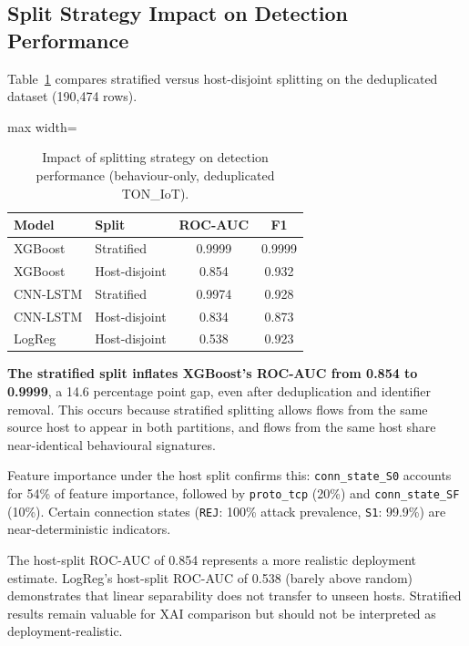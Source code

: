 \documentclass[12pt,a4paper]{report}
\begin{document}
\subsection{Split Strategy Impact on Detection Performance}
\label{sec:split-impact}

Table~\ref{tab:split-impact} compares stratified versus host-disjoint splitting on the deduplicated dataset (190,474 rows).

\begin{table}[H]
\centering
\caption{Impact of splitting strategy on detection performance (behaviour-only, deduplicated TON\_IoT).}
\label{tab:split-impact}
\begin{adjustbox}{max width=\textwidth}
\begin{tabular}{llcc}
\toprule
\textbf{Model} & \textbf{Split} & \textbf{ROC-AUC} & \textbf{F1} \\
\midrule
XGBoost & Stratified & 0.9999 & 0.9999 \\
XGBoost & Host-disjoint & 0.854 & 0.932 \\
CNN-LSTM & Stratified & 0.9974 & 0.928 \\
CNN-LSTM & Host-disjoint & 0.834 & 0.873 \\
LogReg & Host-disjoint & 0.538 & 0.923 \\
\bottomrule
\end{tabular}
\end{adjustbox}
\end{table}

\textbf{The stratified split inflates XGBoost's ROC-AUC from 0.854 to 0.9999}, a 14.6 percentage point gap, even after deduplication and identifier removal. This occurs because stratified splitting allows flows from the same source host to appear in both partitions, and flows from the same host share near-identical behavioural signatures.

Feature importance under the host split confirms this: \texttt{conn\_state\_S0} accounts for 54\% of feature importance, followed by \texttt{proto\_tcp} (20\%) and \texttt{conn\_state\_SF} (10\%). Certain connection states (\texttt{REJ}: 100\% attack prevalence, \texttt{S1}: 99.9\%) are near-deterministic indicators.

The host-split ROC-AUC of 0.854 represents a more realistic deployment estimate. LogReg's host-split ROC-AUC of 0.538 (barely above random) demonstrates that linear separability does not transfer to unseen hosts. Stratified results remain valuable for XAI comparison but should not be interpreted as deployment-realistic.
\end{document}
